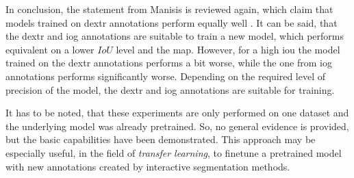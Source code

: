 In conclusion, the statement from Manisis \etal is reviewed again, which claim that models trained on \gls{dextr} annotations perform equally well \cite{Man18-DEXTR}.
It can be said, that the \gls{dextr} and \gls{iog} annotations are suitable to train a new model, which performs equivalent on a lower $ IoU$ level and the \gls{map}.
However, for a high \gls{iou} the model trained on the \gls{dextr} annotations performs a bit worse, while the one from \gls{iog} annotations performs significantly worse.
Depending on the required level of precision of the model, the \gls{dextr} and \gls{iog} annotations are suitable for training.

It has to be noted, that these experiments are only performed on one dataset and the underlying model was already pretrained.
So, no general evidence is provided, but the basic capabilities have been demonstrated.
This approach may be especially useful, in the field of \textit{transfer learning}, to finetune a pretrained model with new annotations created by interactive segmentation methods.

